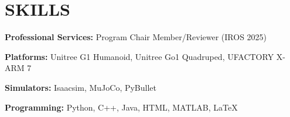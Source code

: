 \documentclass[a4paper,9pt]{extarticle}
\begin{document}
\section*{{\textbf{\fontsize{14pt}{8pt}\selectfont S}\textbf{\scshape KILLS}}}
\textbf{Professional Services:} Program Chair Member/Reviewer (IROS 2025) 
\par\vspace{4pt}\noindent
\textbf{Platforms:}{ Unitree
G1 Humanoid, Unitree Go1 Quadruped, UFACTORY X-ARM 7}
\par\vspace{4pt}\noindent
\textbf{Simulators:}{ Isaacsim, MuJoCo, PyBullet}
\par\vspace{4pt}\noindent
\textbf{Programming:}{ Python, C++, Java, HTML, MATLAB, \LaTeX}
\end{document}

